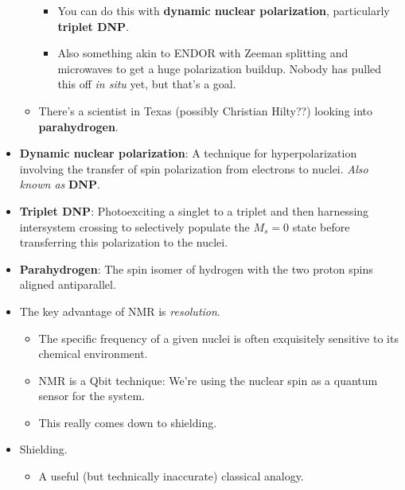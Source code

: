 \documentclass[../notes.tex]{subfiles}
\begin{document}
\begin{itemize}
\begin{itemize}
        \begin{itemize}
            \item You can do this with \textbf{dynamic nuclear polarization}, particularly \textbf{triplet DNP}.
            \item Also something akin to ENDOR with Zeeman splitting and microwaves to get a huge polarization buildup. Nobody has pulled this off \emph{in situ} yet, but that's a goal.
        \end{itemize}
        \item There's a scientist in Texas (possibly Christian Hilty??) looking into \textbf{parahydrogen}.
    \end{itemize}
    \item \textbf{Dynamic nuclear polarization}: A technique for hyperpolarization involving the transfer of spin polarization from electrons to nuclei. \emph{Also known as} \textbf{DNP}.
    \item \textbf{Triplet DNP}: Photoexciting a singlet to a triplet and then harnessing intersystem crossing to selectively populate the $M_s=0$ state before transferring this polarization to the nuclei.
    \item \textbf{Parahydrogen}: The spin isomer of hydrogen with the two proton spins aligned antiparallel.
    \item The key advantage of NMR is \emph{resolution}.
    \begin{itemize}
        \item The specific frequency of a given nuclei is often exquisitely sensitive to its chemical environment.
        \item NMR is a Qbit technique: We're using the nuclear spin as a quantum sensor for the system.
        \item This really comes down to shielding.
    \end{itemize}
    \item Shielding.
    \begin{itemize}
        \item A useful (but technically inaccurate) classical analogy.
        \begin{itemize}

\end{itemize}
\end{itemize}
\end{itemize}
\end{document}
